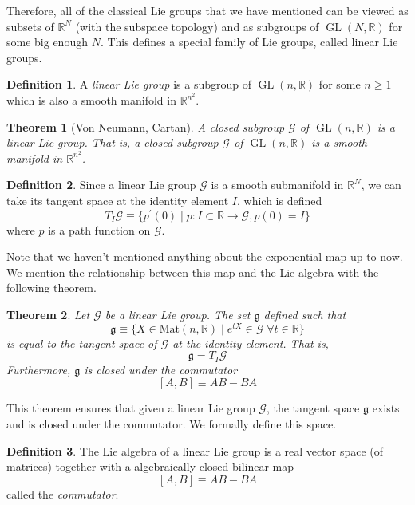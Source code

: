 \documentclass{article}
\DeclareMathOperator{\GL}{GL}
\newtheorem{theorem}{Theorem}[section]
\theoremstyle{remark}
\theoremstyle{definition}
\newtheorem{definition}{Definition}[section]
\begin{document}
Therefore, all of the classical Lie groups that we have mentioned can be viewed as subsets of $\mathbb{R}^N$ (with the subspace topology) and as subgroups of $\GL(N, \mathbb{R})$ for some big enough $N$. This defines a special family of Lie groups, called linear Lie groups. 

\begin{definition}
A \textit{linear Lie group} is a subgroup of $\GL(n, \mathbb{R})$ for some $n \geq 1$ which is also a smooth manifold in $\mathbb{R}^{n^2}$. 
\end{definition}

\begin{theorem}[Von Neumann, Cartan]
A closed subgroup $\mathcal{G}$ of $\GL(n, \mathbb{R})$ is a linear Lie group. That is, a closed subgroup $\mathcal{G}$ of $\GL(n, \mathbb{R})$ is a smooth manifold in $\mathbb{R}^{n^2}$.
\end{theorem}

\begin{definition}
Since a linear Lie group $\mathcal{G}$ is a smooth submanifold in $\mathbb{R}^N$, we can take its tangent space at the identity element $I$, which is defined 
\[T_I \mathcal{G} \equiv \{p^\prime (0) \;|\; p: I \subset \mathbb{R} \longrightarrow \mathcal{G}, p(0) = I\}\]
where $p$ is a path function on $\mathcal{G}$. 
\end{definition}

Note that we haven't mentioned anything about the exponential map up to now. We mention the relationship between this map and the Lie algebra with the following theorem. 

\begin{theorem}
Let $\mathcal{G}$ be a linear Lie group. The set $\mathfrak{g}$ defined such that
\[\mathfrak{g} \equiv \{X \in \text{Mat}(n, \mathbb{R}) \; | \; e^{t X} \in \mathcal{G} \; \forall t \in \mathbb{R}\}\]
is equal to the tangent space of $\mathcal{G}$ at the identity element. That is, 
\[\mathfrak{g} = T_I \mathcal{G}\]
Furthermore, $\mathfrak{g}$ is closed under the commutator 
\[[A,B] \equiv A B - B A\]
\end{theorem}

This theorem ensures that given a linear Lie group $\mathcal{G}$, the tangent space $\mathfrak{g}$ exists and is closed under the commutator. We formally define this space. 

\begin{definition}
The Lie algebra of a linear Lie group is a real vector space (of matrices) together with a algebraically closed bilinear map 
\[[A,B] \equiv A B - B A\]
called the \textit{commutator}. 
\end{definition} 
\end{document}
